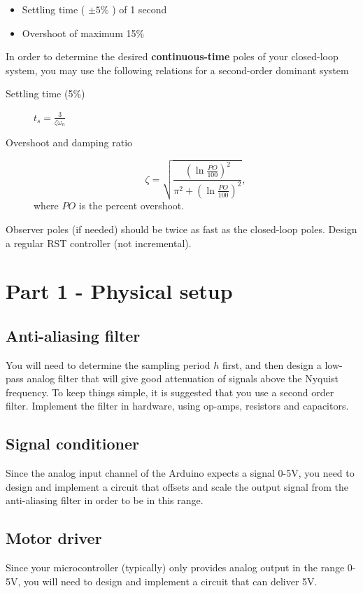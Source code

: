 \documentclass[a4paper]{scrartcl}
\begin{document}
\begin{itemize}
\item Settling time ( \(\pm 5\%\) ) of 1 second
\item Overshoot of maximum 15\%
\end{itemize}

In order to determine the desired \textbf{continuous-time} poles of your closed-loop system, you may use the following relations for a second-order dominant system
\begin{description}
\item[{Settling time (5\%)}] \(t_s = \frac{3}{\zeta\omega_n}\)
\item[{Overshoot and damping ratio}] \[ \zeta = \sqrt{ \frac{(\ln \frac{PO}{100})^2}{\pi^2 + (\ln \frac{PO}{100})^2}}, \]
     where \(PO\) is the percent overshoot.
\end{description}

Observer poles (if needed) should be twice as fast as the closed-loop poles. Design a regular RST controller (not incremental).

\section*{Part 1 - Physical setup}
\label{sec-3}
\subsection*{Anti-aliasing filter}
\label{sec-3-1}
You will need to determine the sampling period \(h\) first, and then design a low-pass analog filter that will give good attenuation of signals above the Nyquist frequency. To keep things simple, it is suggested that you use a second order filter. Implement the filter in hardware, using op-amps, resistors and capacitors. 
\subsection*{Signal conditioner}
\label{sec-3-2}
Since the analog input channel of the Arduino expects a signal 0-5V, you need to design and implement a circuit that offsets and scale the output signal from the anti-aliasing filter in order to be in this range.

\subsection*{Motor driver}
\label{sec-3-3}
Since your microcontroller (typically) only provides analog output in the range 0-5V, you will need to design and implement a circuit that can deliver \textpm{} 5V.
\end{document}
